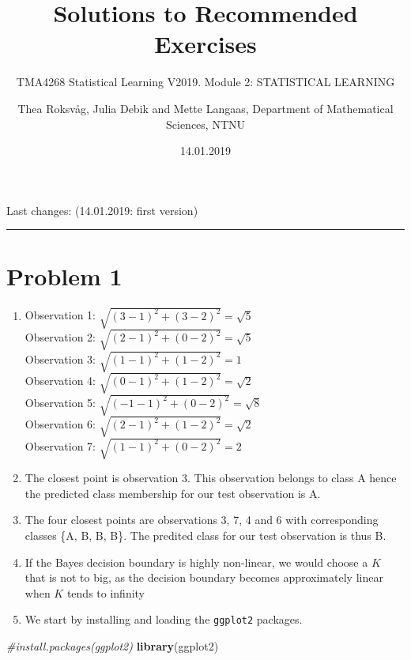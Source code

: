 \documentclass[]{article}
\title{Solutions to Recommended Exercises}
\subtitle{TMA4268 Statistical Learning V2019. Module 2: STATISTICAL LEARNING}
\author{Thea Roksvåg, Julia Debik and Mette Langaas, Department of Mathematical
Sciences, NTNU}
\date{14.01.2019}
\newenvironment{Shaded}{\begin{snugshade}}{\end{snugshade}}
\newcommand{\KeywordTok}[1]{\textcolor[rgb]{0.13,0.29,0.53}{\textbf{#1}}}
\newcommand{\CommentTok}[1]{\textcolor[rgb]{0.56,0.35,0.01}{\textit{#1}}}
\newcommand{\NormalTok}[1]{#1}
\providecommand{\tightlist}{%
  \setlength{\itemsep}{0pt}\setlength{\parskip}{0pt}}
\begin{document}
\maketitle

{
\setcounter{tocdepth}{2}
\tableofcontents
}
Last changes: (14.01.2019: first version)

\begin{center}\rule{0.5\linewidth}{\linethickness}\end{center}

\section{Problem 1}\label{problem-1}

\begin{enumerate}
\def\labelenumi{\alph{enumi}.}
\tightlist
\item
  Observation 1: \(\sqrt{(3-1)^2+(3-2)^2}= \sqrt{5}\)\\
  Observation 2: \(\sqrt{(2-1)^2+(0-2)^2}= \sqrt{5}\)\\
  Observation 3: \(\sqrt{(1-1)^2+(1-2)^2}= 1\)\\
  Observation 4: \(\sqrt{(0-1)^2+(1-2)^2}= \sqrt{2}\)\\
  Observation 5: \(\sqrt{(-1-1)^2+(0-2)^2}= \sqrt{8}\)\\
  Observation 6: \(\sqrt{(2-1)^2+(1-2)^2}= \sqrt{2}\)\\
  Observation 7: \(\sqrt{(1-1)^2+(0-2)^2} = 2\)
\item
  The closest point is observation 3. This observation belongs to class
  A hence the predicted class membership for our test observation is A.
\item
  The four closest points are observations 3, 7, 4 and 6 with
  corresponding classes \{A, B, B, B\}. The predited class for our test
  observation is thus B.
\item
  If the Bayes decision boundary is highly non-linear, we would choose a
  \(K\) that is not to big, as the decision boundary becomes
  approximately linear when \(K\) tends to infinity
\item
  We start by installing and loading the \texttt{ggplot2} packages.
\end{enumerate}

\begin{Shaded}
\begin{Highlighting}[]
\CommentTok{#install.packages(ggplot2)}
\KeywordTok{library}\NormalTok{(ggplot2)}
\end{Highlighting}
\end{Shaded}
\end{document}
